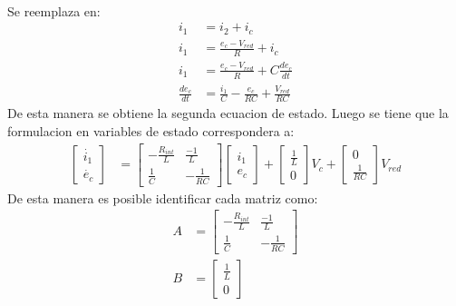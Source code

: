 \documentclass[
  11pt,
  letterpaper,
   addpoints,
   answers
  ]{exam}
\begin{document}
\begin{questions}
\begin{solution}
\begin{align}
    \end{align}
    Se reemplaza en:
    \begin{align}
        i_{1} &= i_{2} + i_{c}\\
        i_{1} &= \frac{e_{c} - V_{red}}{R} + i_{c}\\
        i_{1} &= \frac{e_{c} - V_{red}}{R} + C\frac{de_{c}}{dt}\\
        \frac{de_{c}}{dt} &= \frac{i_{1}}{C} - \frac{e_{c}}{RC}  + \frac{V_{red}}{RC}
    \end{align}
    De esta manera se obtiene la segunda ecuacion de estado. Luego se tiene que la formulacion en variables de estado correspondera a:
    \begin{align}
        \begin{bmatrix}
            \dot{i_{1}}\\
            \dot{e_{c}}
        \end{bmatrix}
        &=
        \begin{bmatrix}
            -\frac{R_{int}}{L} & \frac{-1}{L}\\
            \frac{1}{C} & -\frac{1}{RC}
        \end{bmatrix}
        \begin{bmatrix}
            i_{1}\\
            e_{c}
        \end{bmatrix}
        +
        \begin{bmatrix}
            \frac{1}{L}\\
            0
        \end{bmatrix}
        V_{c}
        +
        \begin{bmatrix}
            0\\
            \frac{1}{RC}
        \end{bmatrix}
        V_{red}
    \end{align}
    De esta manera es posible identificar cada matriz como:
    \begin{align}
        A &=
        \begin{bmatrix}
            -\frac{R_{int}}{L} & \frac{-1}{L}\\
            \frac{1}{C} & -\frac{1}{RC}
        \end{bmatrix}\\
        B &=
        \begin{bmatrix}
            \frac{1}{L}\\
            0
        \end{bmatrix}
    \end{align}

\end{solution}
\end{questions}
\end{document}
